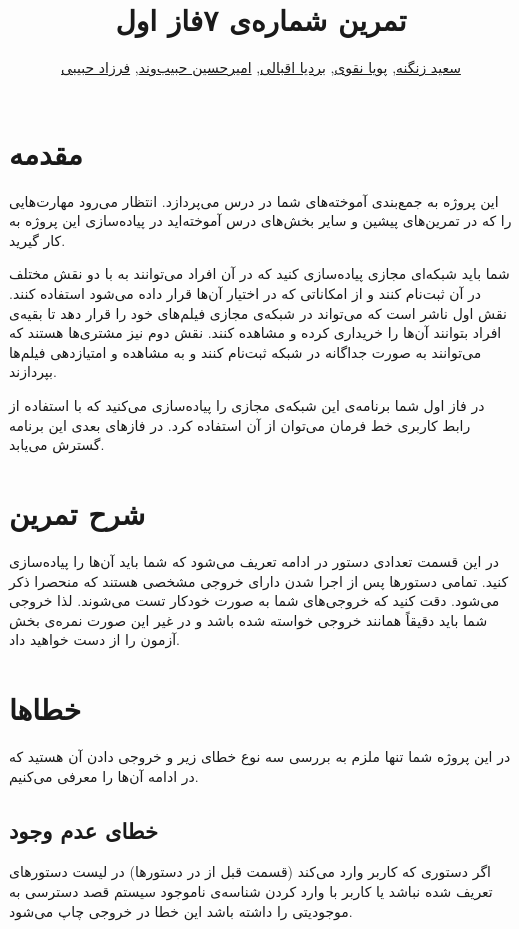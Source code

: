 \documentclass{utap}
\title{تمرین شماره‌ی ۷\normalsize\qquad فاز اول}
\author{%
	\href{mailto:zangenehsaeed412@gmail.com?subject=[AP\%20S98\%20A7]\%20}{سعید زنگنه},
	\href{mailto:naghavi.pooya@gmail.com?subject=[AP\%20S98\%20A7]\%20}{پویا نقوی},
	\href{mailto:bardia.eghbali@gmail.com?subject=[AP\%20S98\%20A7]\%20}{بردیا اقبالی},
	\href{mailto:ahhabibvand@gmail.com?subject=[AP\%20S98\%20A7]\%20}{امیرحسین حبیب‌وند},
	\href{mailto:farzadhabibii98@gmail.com?subject=[AP\%20S98\%20A7]\%20}{فرزاد حبیبی}
}
\begin{document}
	\maketitle
	\section*{مقدمه}
		این پروژه به جمع‌بندی آموخته‌های شما در درس می‌پردازد. انتظار می‌رود مهارت‌هایی را که در تمرین‌های پیشین و سایر بخش‌های درس آموخته‌اید در پیاده‌سازی این پروژه به کار گیرید.
		
		شما باید شبکه‌ای مجازی پیاده‌سازی کنید که در آن افراد می‌توانند به با دو نقش مختلف در آن ثبت‌نام کنند و از امکاناتی که در اختیار آن‌ها قرار داده می‌شود استفاده کنند. نقش اول ناشر است که می‌تواند در شبکه‌ی مجازی فیلم‌های خود را قرار دهد تا بقیه‌ی افراد بتوانند آن‌ها را خریداری کرده و مشاهده کنند. نقش دوم نیز مشتری‌ها هستند که می‌توانند به صورت جداگانه در شبکه ثبت‌نام کنند و به مشاهده‌ و امتیازدهی فیلم‌ها بپردازند.
		
		در فاز اول شما برنامەی این شبکه‌ی مجازی را پیادەسازی می‌کنید که با استفاده از رابط‌ کاربری خط فرمان می‌توان از آن استفاده کرد. در فازهای بعدی این برنامه گسترش می‌یابد.


	\section{شرح تمرین}
	در این قسمت تعدادی دستور در ادامه تعریف می‌شود که شما باید آن‌ها را پیاده‌سازی کنید. تمامی دستورها پس از اجرا شدن دارای خروجی مشخصی هستند که منحصرا ذکر می‌شود. دقت کنید که خروجی‌های شما به صورت خودکار تست می‌شوند. لذا خروجی شما باید دقیقاً همانند خروجی خواسته شده باشد و در غیر این صورت نمره‌ی بخش آزمون
	را از دست خواهید داد.

	\section{خطاها}
	
	در این پروژه شما تنها ملزم به بررسی سه نوع خطای زیر و خروجی دادن آن هستید که در ادامه آن‌ها را معرفی می‌کنیم.
	
	\subsection{خطای عدم وجود}
	
	اگر دستوری که کاربر وارد می‌کند (قسمت قبل از  در دستورها) در لیست دستورهای تعریف شده نباشد یا کاربر با وارد کردن شناسه‌ی ناموجود سیستم قصد دسترسی به موجودیتی را داشته باشد این خطا در خروجی چاپ می‌شود.
	
\end{document}

